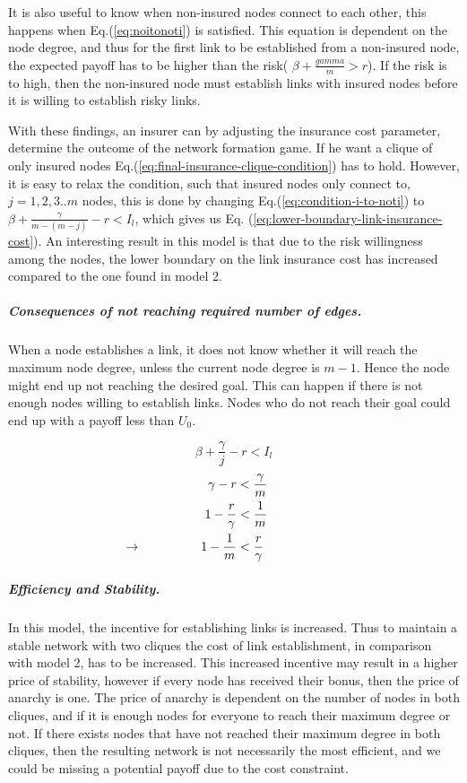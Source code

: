 It is also useful to know when non-insured nodes connect to each other, this happens when Eq.(\ref{eq:noitonoti}) is satisfied. This equation is dependent on the node degree, and thus for the first link to be established from a non-insured node, the expected payoff has to be higher than the risk( $\beta+\frac{gamma}{m}>r$). If the risk is to high, then the non-insured node must establish links with insured nodes before it is willing to establish risky links.

With these findings, an insurer can by adjusting the insurance cost parameter, determine the outcome of the network formation game.
If he want a clique of only insured nodes Eq.(\ref{eq:final-insurance-clique-condition}) has to
hold. However, it is easy to relax the condition, such that insured nodes only connect to, $j=1,2,3..m$ nodes,
   this is done by changing Eq.(\ref{eq:condition-i-to-noti}) to $\beta+\frac{\gamma}{m-(m-j)}-r<I_{l}$, which
    gives us Eq. (\ref{eq:lower-boundary-link-insurance-cost}).
An interesting result in this model is that due to the risk willingness among the nodes, the lower boundary on the link insurance cost has increased compared to the one found in model 2. 

\subparagraph{Consequences of not reaching required number of edges.}
When a node establishes a link, it does not know whether it will reach the maximum node degree, unless the current node degree is $m-1$. Hence the node might end up not reaching the desired goal. This can happen if there is not enough nodes willing to establish links. Nodes who do not reach their goal could end up with a payoff less than $U_{0}$. 

\begin{equation} 
\beta+\frac{\gamma}{j}-r<I_{l}
\label{eq:lower-boundary-link-insurance-cost}
\end{equation} 
\begin{eqnarray}
\gamma-r &<\frac{\gamma}{m}\nonumber \\
1-\frac{r}{\gamma}&<\frac{1}{m} \nonumber \\
\llap{$\rightarrow$\hspace{50pt}}1-\frac{1}{m}&<\frac{r}{\gamma}
\label{eq:noinsuredcliqueconditon}
\end{eqnarray}


\subparagraph{Efficiency and Stability.}

In this model, the incentive for establishing links is increased. Thus to maintain a stable network with two cliques the cost of link establishment, in comparison with model 2, has to be increased. This increased incentive may result in a higher price of stability, however if every node has received their bonus, then the price of anarchy is one. The price of anarchy is dependent on the number of nodes in both cliques, and if it is enough nodes for everyone to reach their maximum degree or not. 
If there exists nodes that have not reached their maximum degree in both cliques, then the resulting network is not necessarily the most efficient, and we could be missing a potential payoff due to the cost constraint. 

